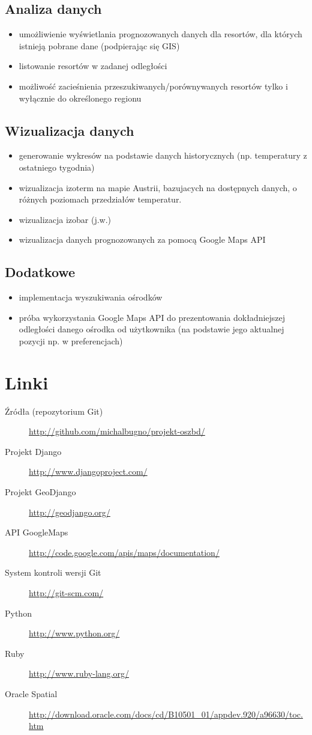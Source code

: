 \documentclass[12pt]{article}
\begin{document}
\subsection{Analiza danych}
\begin{itemize}
  \item umożliwienie wyświetlania prognozowanych danych dla resortów, dla których istnieją pobrane dane
        (podpierając się GIS)
  \item listowanie resortów w zadanej odległości
  \item możliwość zacieśnienia przeszukiwanych/porównywanych resortów tylko i wyłącznie do określonego regionu
\end{itemize}

\subsection{Wizualizacja danych}
\begin{itemize}
  \item generowanie wykresów na podstawie danych historycznych (np. temperatury z ostatniego tygodnia)
  \item wizualizacja izoterm na mapie Austrii, bazujacych na dostępnych danych, o różnych poziomach przedziałów temperatur.
  \item wizualizacja izobar (j.w.)
  \item wizualizacja danych prognozowanych za pomocą Google Maps API
\end{itemize}

\subsection{Dodatkowe}
\begin{itemize}
  \item implementacja wyszukiwania ośrodków
  \item próba wykorzystania Google Maps API do prezentowania dokładniejszej odległości danego ośrodka od
        użytkownika (na podstawie jego aktualnej pozycji np. w preferencjach)
\end{itemize}

\section{Linki}
\begin{description}
  \item[Źródła (repozytorium Git)] \url{http://github.com/michalbugno/projekt-oszbd/}
  \item[Projekt Django] \url{http://www.djangoproject.com/}
  \item[Projekt GeoDjango] \url{http://geodjango.org/}
  \item[API GoogleMaps] \url{http://code.google.com/apis/maps/documentation/}
  \item[System kontroli wersji Git] \url{http://git-scm.com/}
  \item[Python] \url{http://www.python.org/}
  \item[Ruby] \url{http://www.ruby-lang.org/}
  \item[Oracle Spatial] \url{http://download.oracle.com/docs/cd/B10501_01/appdev.920/a96630/toc.htm}
\end{description}
\end{document}
